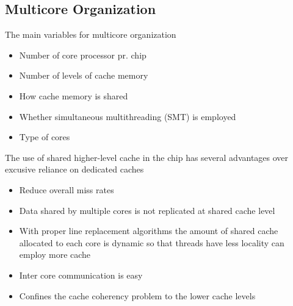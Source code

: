 \documentclass[12pt, a4paper]{article}
\begin{document}
		\subsection{Multicore Organization}
			The main variables for multicore organization
			\begin{itemize}
				\item Number of core processor pr. chip
				\item Number of levels of cache memory
				\item How cache memory is shared
				\item Whether simultaneous multithreading (SMT) is employed
				\item Type of cores
			\end{itemize}
			The use of shared higher-level cache in the chip has several advantages over excusive reliance on dedicated caches
			\begin{itemize}
				\item Reduce overall miss rates
				\item Data shared by multiple cores is not replicated at shared cache level
				\item With proper line replacement algorithms the amount of shared cache allocated to each core is dynamic so that threads have less locality can employ more cache
				\item Inter core communication is easy
				\item Confines the cache coherency problem to the lower cache levels
			\end{itemize}
\end{document}
